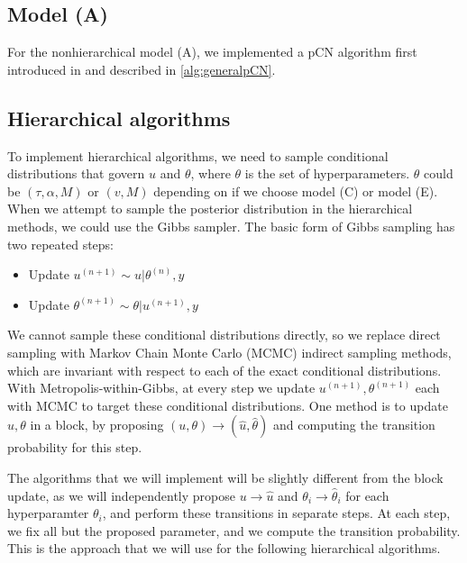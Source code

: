 \documentclass{siamart1116}
\begin{document}
    \subsection{Model (A)}
        For the nonhierarchical model (A), we implemented a pCN algorithm first introduced in \cite{BeRoStVo08} and described in \cref{alg:generalpCN}.

    \subsection{Hierarchical algorithms}
        To implement hierarchical algorithms, we need to sample conditional distributions that govern $u$ and $\theta$, where $\theta$ is the set of hyperparameters. $\theta$ could be $(\tau, \alpha, M)$ or $(v, M)$ depending on if we choose model (C) or model (E). When we attempt to sample the posterior distribution in the hierarchical methods, we could use the Gibbs sampler. The basic form of Gibbs sampling has two repeated steps:
        \begin{itemize}
        \item Update $u^{(n+1)} \sim u|\theta^{(n)}, y$
        \item Update $\theta^{(n+1)} \sim \theta|u^{(n+1)}, y$
        \end{itemize}
        We cannot sample these conditional distributions directly, so we replace direct sampling with Markov Chain Monte Carlo (MCMC) indirect sampling methods, which are invariant with respect to each of the exact conditional distributions. With Metropolis-within-Gibbs, at every step we update $u^{(n+1)}, \theta^{(n+1)}$ each with MCMC to target these conditional distributions. One method is to update $u, \theta$ in a block, by proposing $(u,\theta) \to  (\hat u, \hat \theta)$ and computing the transition probability for this step. 

        The algorithms that we will implement will be slightly different from the block update, as we will independently propose $u \to \hat u$ and $\theta_i \to \hat \theta_i$ for each hyperparamter $\theta_i$, and perform these transitions in separate steps. At each step, we fix all but the proposed parameter, and we compute the transition probability. This is the approach that we will use for the following hierarchical algorithms.
\end{document}
